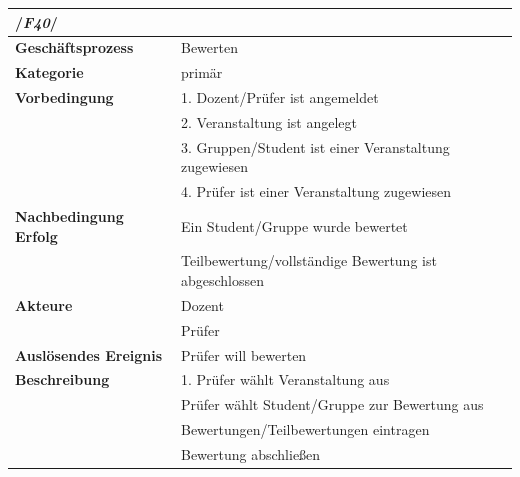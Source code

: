 	
			\begin{table}[H]
			\begin{tabular}{ll}
				\multicolumn{2}{l}{/\textbf{\textit{F40}}/}\\\hline
				 \textbf{Geschäftsprozess} & Bewerten \\ 
				 \textbf{Kategorie} & primär \\ 
				 \textbf{Vorbedingung} & 1. Dozent/Prüfer ist angemeldet  \\ 
				 & 2. Veranstaltung ist angelegt\\
				 & 3. Gruppen/Student ist einer Veranstaltung zugewiesen\\
				 & 4. Prüfer ist einer Veranstaltung zugewiesen\\
				 \textbf{Nachbedingung Erfolg\phantom{xxxx}} & Ein Student/Gruppe wurde bewertet\\
				 & Teilbewertung/vollständige Bewertung ist abgeschlossen\\ 
				 \textbf{Akteure} & Dozent \\ 
				 & Prüfer\\
				 \textbf{Auslösendes Ereignis} & Prüfer will bewerten \\ 
				 \textbf{Beschreibung} &  1. Prüfer wählt Veranstaltung aus\\
				 & Prüfer wählt Student/Gruppe zur Bewertung aus\\
				 & Bewertungen/Teilbewertungen eintragen\\
				 & Bewertung abschließen\\
			
				 \end{tabular} 
			\label{tab:F40}
			\end{table}
			
